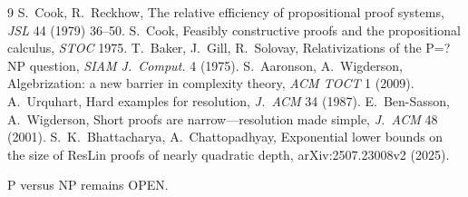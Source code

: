 \documentclass[11pt]{article}
\theoremstyle{definition}
\begin{document}
\begin{thebibliography}{9}
 S.~Cook, R.~Reckhow, The relative efficiency of propositional proof systems, \emph{JSL} 44 (1979) 36--50.
 S.~Cook, Feasibly constructive proofs and the propositional calculus, \emph{STOC} 1975.
 T.~Baker, J.~Gill, R.~Solovay, Relativizations of the P=?NP question, \emph{SIAM J.\ Comput.} 4 (1975).
 S.~Aaronson, A.~Wigderson, Algebrization: a new barrier in complexity theory, \emph{ACM TOCT} 1 (2009).
 A.~Urquhart, Hard examples for resolution, \emph{J.\ ACM} 34 (1987).
 E.~Ben-Sasson, A.~Wigderson, Short proofs are narrow---resolution made simple, \emph{J.\ ACM} 48 (2001).
 S.~K.~Bhattacharya, A.~Chattopadhyay, Exponential lower bounds on the size of ResLin proofs of nearly quadratic depth, arXiv:2507.23008v2 (2025).
\end{thebibliography}

\noindent P versus NP remains OPEN.
\end{document}
